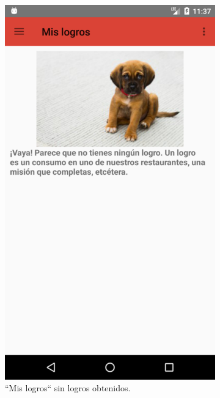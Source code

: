 \documentclass[twoside]{report}
\begin{document}
\begin{figure}[H]
\begin{center}
	\begin{subfigure}[t]{.3\linewidth}
		\includegraphics[scale=0.2]{images/userguide/5.png}
		\caption{“Mis logros“ sin logros obtenidos.}
	\end{subfigure}\hspace{5mm}%
	\begin{subfigure}[t]{.3\linewidth} 

\end{subfigure}
\end{center}
\end{figure}
\end{document}
